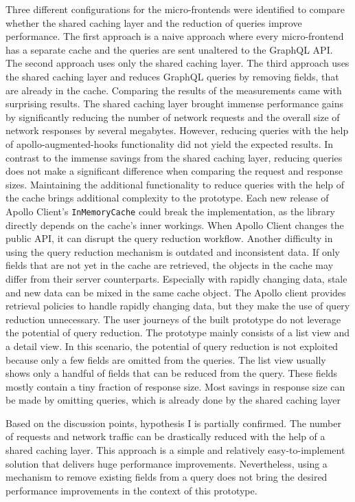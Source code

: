 \noindent Three different configurations for the micro-frontends were identified to compare whether the shared caching layer and the reduction of queries improve performance. The first approach is a naive approach where every micro-frontend has a separate cache and the queries are sent unaltered to the GraphQL \ac{API}. The second approach uses only the shared caching layer. The third approach uses the shared caching layer and reduces GraphQL queries by removing fields, that are already in the cache. Comparing the results of the measurements came with surprising results. The shared caching layer brought immense performance gains by significantly reducing the number of network requests and the overall size of network responses by several megabytes. However, reducing queries with the help of apollo-augmented-hooks functionality did not yield the expected results. In contrast to the immense savings from the shared caching layer, reducing queries does not make a significant difference when comparing the request and response sizes. Maintaining the additional functionality to reduce queries with the help of the cache brings additional complexity to the prototype. Each new release of Apollo Client's \texttt{InMemoryCache} could break the implementation, as the library directly depends on the cache's inner workings. When Apollo Client changes the public \ac{API}, it can disrupt the query reduction workflow. Another difficulty in using the query reduction mechanism is outdated and inconsistent data. If only fields that are not yet in the cache are retrieved, the objects in the cache may differ from their server counterparts. Especially with rapidly changing data, stale and new data can be mixed in the same cache object. The Apollo client provides retrieval policies to handle rapidly changing data, but they make the use of query reduction unnecessary. The user journeys of the built prototype do not leverage the potential of query reduction. The prototype mainly consists of a list view and a detail view. In this scenario, the potential of query reduction is not exploited because only a few fields are omitted from the queries. The list view usually shows only a handful of fields that can be reduced from the query. These fields mostly contain a tiny fraction of response size. Most savings in response size can be made by omitting queries, which is already done by the shared caching layer

\bigskip

\noindent Based on the discussion points, hypothesis I is partially confirmed. The number of requests and network traffic can be drastically reduced with the help of a shared caching layer. This approach is a simple and relatively easy-to-implement solution that delivers huge performance improvements. Nevertheless, using a mechanism to remove existing fields from a query does not bring the desired performance improvements in the context of this prototype. 

